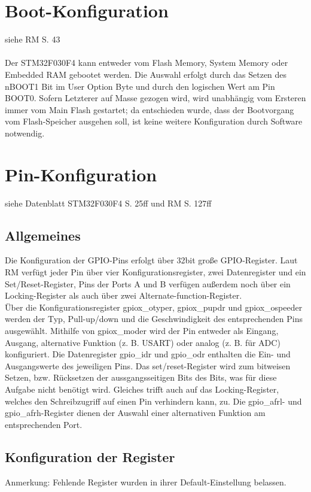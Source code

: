 \documentclass[11pt]{report}
\begin{document}
	\section{Boot-Konfiguration}
		siehe RM S. 43\\
		\\Der STM32F030F4 kann entweder vom Flash Memory, System Memory oder Embedded RAM gebootet werden. Die Auswahl erfolgt durch das Setzen des nBOOT1 Bit im User Option Byte und durch den logischen Wert am Pin BOOT0. Sofern Letzterer auf Masse gezogen wird, wird unabhängig vom Ersteren immer vom Main Flash gestartet; da entschieden wurde, dass der Bootvorgang vom Flash-Speicher ausgehen soll, ist keine weitere Konfiguration durch Software notwendig.
	\section{Pin-Konfiguration}
		siehe Datenblatt STM32F030F4 S. 25ff und RM S. 127ff
		\subsection{Allgemeines}
			Die Konfiguration der GPIO-Pins erfolgt über 32bit große GPIO-Register. Laut RM verfügt jeder Pin über vier Konfigurationsregister, zwei Datenregister und ein Set/Reset-Register, Pins der Ports A und B verfügen außerdem noch über ein Locking-Register als auch über zwei Alternate-function-Register.\\
			Über die Konfigurationsregister gpiox\_otyper, gpiox\_pupdr und gpiox\_ospeeder werden der Typ, Pull-up/down und die Geschwindigkeit des entsprechenden Pins ausgewählt. Mithilfe von gpiox\_moder wird der Pin entweder als Eingang, Ausgang, alternative Funktion (z. B. USART) oder analog (z. B. für ADC) konfiguriert. Die Datenregister gpio\_idr und gpio\_odr enthalten die Ein- und Ausgangswerte des jeweiligen Pins. Das set/reset-Register wird zum bitweisen Setzen, bzw. Rücksetzen der aussgangsseitigen Bits des Bits, was für diese Aufgabe nicht benötigt wird. Gleiches trifft auch auf das Locking-Register, welches den Schreibzugriff auf einen Pin verhindern kann, zu. Die gpio\_afrl- und gpio\_afrh-Register dienen der Auswahl einer alternativen Funktion am entsprechenden Port.
		\subsection{Konfiguration der Register}
			Anmerkung: Fehlende Register wurden in ihrer Default-Einstellung belassen.
\end{document}
